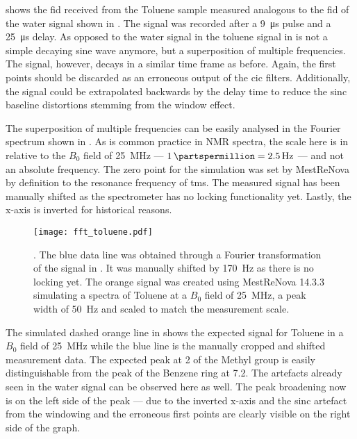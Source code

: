  shows the \acrshort{fid} received from the Toluene sample measured analogous to the \acrshort{fid} of the water signal shown in . The signal was recorded after a \qty{9}{\micro\second} pulse and a \qty{25}{\micro\second} delay. As opposed to the water signal in  the toluene signal in  is not a simple decaying sine wave anymore, but a superposition of multiple frequencies. The signal, however, decays in a similar time frame as before. Again, the first points should be discarded as an erroneous output of the \acrshort{cic} filters. Additionally, the signal could be extrapolated backwards by the delay time to reduce the sinc baseline distortions stemming from the window effect.

The superposition of multiple frequencies can be easily analysed in the Fourier spectrum shown in . As is common practice in NMR spectra, the scale here is in \unit{\partspermillion} relative to the \(B_0\) field of \qty{25}{\mega\hertz} --- \(\qty{1}{\partspermillion} = \qty{2.5}{\hertz}\) --- and not an absolute frequency. The zero point for the simulation was set by MestReNova by definition to the resonance frequency of \acrshort{tms}.  The measured signal has been manually shifted as the spectrometer has no locking functionality yet. Lastly, the x-axis is inverted for historical reasons.

\begin{figure}[h!bt]
    \centering
    \texttt{[image: fft\_toluene.pdf]}
    \caption{. The blue data line was obtained through a Fourier transformation of the signal in . It was manually shifted by \qty{170}{\hertz} as there is no locking yet. The orange signal was created using MestReNova 14.3.3 simulating a spectra of Toluene at a $B_0$ field of \qty{25}{\mega\hertz}, a peak width of \qty{50}{\hertz} and scaled to match the measurement scale.}
\end{figure}

The simulated dashed orange line in  shows the expected signal for Toluene in a \(B_0\) field of \qty{25}{\mega\hertz} while the blue line is the manually cropped and shifted measurement data. The expected peak at \qty{2}{\partspermillion} of the Methyl group is easily distinguishable from the peak of the Benzene ring at \approx{}\qty{7.2}{\partspermillion}. The artefacts already seen in the water signal can be observed here as well. The peak broadening now is on the left side of the peak --- due to the inverted x-axis and the sinc artefact from the windowing and the erroneous first points are clearly visible on the right side of the graph.